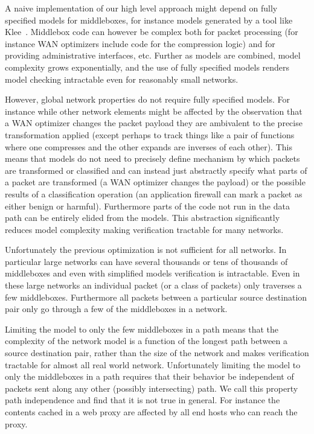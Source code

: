 \documentclass[letterpaper]{article}
\begin{document}
A naive implementation of our high level approach might depend on fully specified models for middleboxes, for instance
models generated by a tool like Klee~\cite{cadar2008klee}. Middlebox code can however be complex both for packet
processing (for instance WAN optimizers include code for the compression logic) and for providing administrative
interfaces, etc. Further as models are combined, model complexity grows exponentially, and the use of fully specified
models renders model checking intractable even for reasonably small networks.

However, global network properties do not require fully specified models. For instance while other
network elements might be affected by the observation that a WAN optimizer changes the packet payload they are
ambivalent to the precise transformation applied (except perhaps to track things like a pair of functions
where one compresses and the other expands are inverses of each other). This  means that models do not need to precisely
define mechanism by which packets are transformed or classified and can instead just abstractly specify what parts of a
packet are transformed (a WAN optimizer changes the payload) or the possible results of a classification operation (an
application firewall can mark a packet as either benign or harmful). Furthermore parts of the code not run in
the data path can be entirely elided from the models. This abstraction significantly reduces model complexity making
verification tractable for many networks.

Unfortunately the previous optimization is not sufficient for all networks. In particular large networks can have
several thousands or tens of thousands of middleboxes and even with simplified models verification is intractable. Even
in these large networks an individual packet (or a class of packets) only traverses a few middleboxes. Furthermore all
packets between a particular source destination pair only go through a few of the middleboxes in a network. 

Limiting the model to only the few middleboxes in a path means that the complexity of the network model is a function of
the longest path between a source destination pair, rather than the size of the network and makes verification tractable
for almost all real world network. Unfortunately limiting the model to only the middleboxes in a path requires that
their behavior be independent of packets sent along any other (possibly intersecting) path. We call this property path
independence and find that it is not true in general. For instance the contents cached in a web proxy are affected by
all end hosts who can reach the proxy. 
\end{document}
